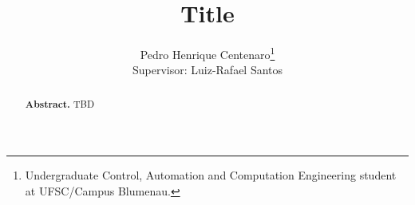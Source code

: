 \documentclass[english, a4paper, 12pt, bibliography=totoc]{scrartcl}
\title{Title}
\author{Pedro Henrique Centenaro\thanks{Undergraduate Control, Automation and Computation Engineering student at UFSC/Campus Blumenau.} \\ Supervisor: Luiz-Rafael Santos}
\date{}
\begin{document}
\onehalfspacing
\maketitle
\renewcommand\thelinenumber{\textcolor{darkgray}{\arabic{linenumber}}}

\begin{abstract}
   \textbf{Abstract.} TBD
\end{abstract}



%
%
%


\printbibliography

\appendix
\end{document}

